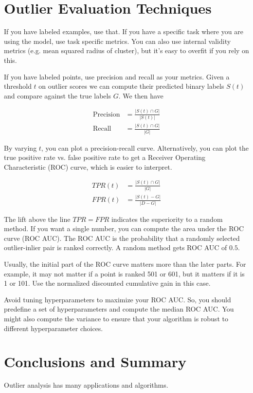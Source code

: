 \documentclass[a4paper]{article}
\begin{document}
\section{Outlier Evaluation Techniques}
If you have labeled examples, use that. If you have a specific task where you
are using the model, use task specific metrics. You can also use internal
validity metrics (e.g. mean squared radius of cluster), but it's easy to overfit
if you rely on this.

If you have labeled points, use precision and recall as your metrics. Given a
threshold $t$ on outlier scores we can compute their predicted binary labels
$S(t)$ and compare against the true labels $G$. We then have

\begin{align}
  \text{Precision} &= \frac{|S(t) \cap G|}{|S(t)|} \\
  \text{Recall} &= \frac{|S(t) \cap G|}{|G|}
\end{align}

By varying $t$, you can plot a precision-recall curve. Alternatively, you
can plot the true positive rate vs. false positive rate to get a Receiver
Operating Characteristic (ROC) curve, which is easier to interpret.

\begin{align}
  TPR(t) &= \frac{|S(t) \cap G|}{|G|} \\
  FPR(t) &= \frac{|S(t) - G|}{|D - G|}
\end{align}

The lift above the line $TPR = FPR$ indicates the superiority to a random
method. If you want a single number, you can compute the area under the ROC
curve (ROC AUC). The ROC AUC is the probability that a randomly selected
outlier-inlier pair is ranked correctly. A random method gets ROC AUC of $0.5$.

Usually, the initial part of the ROC curve matters more than the later parts.
For example, it may not matter if a point is ranked 501 or 601, but it matters
if it is 1 or 101. Use the normalized discounted cumulative gain in this case.

Avoid tuning hyperparameters to maximize your ROC AUC. So, you should predefine
a set of hyperparameters and compute the median ROC AUC. You might also
compute the variance to ensure that your algorithm is robust to different
hyperparameter choices.

\section{Conclusions and Summary}
Outlier analysis has many applications and algorithms.
\end{document}
